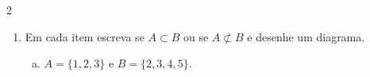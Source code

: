 \documentclass[a4paper,14pt]{article}
\begin{document}
\begin{multicols}{2}
\begin{enumerate}
\begin{enumerate}[a)]
				\item (~~) $\{1, 2\} \supset \{1, 2\}$ \\\\\\\\\\\\
				\item (~~) $3 = \{3\}$ \\\\\\\\\\\\
				\item (~~) $\{1\} \supset \{1, 2\}$ \\\\\\\\\\\\
				\item (~~) $2 \in 2$ \\\\\\\\\\\\
				\item (~~) $\{\varnothing\} \subset \varnothing$ \\\\\\\\
				\item (~~) $\{1\} \in \{0, \{1\}, 2\}$ \\\\\\\\\\\\
			\end{enumerate}
			\item Em cada item escreva se $A \subset B$ ou se $A \not\subset B$ e desenhe um diagrama.
			\begin{enumerate}[a)]
				\item $A = \{1, 2, 3\}$ e $B = \{2, 3, 4, 5\}$. \\\\\\\\\\\\\\\\\\\\\\\\\\\\

\end{enumerate}
\end{enumerate}
\end{multicols}
\end{document}
